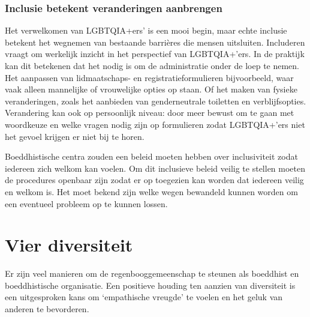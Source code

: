 \documentclass[12pt,openany]{book}
\begin{document}
\subsubsection*{Inclusie betekent veranderingen aanbrengen}

Het verwelkomen van LGBTQIA+ers' is een mooi begin, maar echte inclusie betekent het wegnemen van bestaande barrières die mensen uitsluiten. Includeren vraagt om werkelijk inzicht in het perspectief van LGBTQIA+'ers. In de praktijk kan dit betekenen dat het nodig is om de administratie onder de loep te nemen. Het aanpassen van lidmaatschaps- en registratieformulieren bijvoorbeeld, waar vaak alleen mannelijke of vrouwelijke opties op staan. Of het maken van fysieke veranderingen, zoals het aanbieden van genderneutrale toiletten en verblijfsopties.  Verandering kan ook op persoonlijk niveau: door meer bewust om te gaan met woordkeuze en welke vragen nodig zijn op formulieren zodat LGBTQIA+'ers niet het gevoel krijgen er niet bij te horen.

Boeddhistische centra zouden een beleid moeten hebben over inclusiviteit zodat iedereen zich welkom kan voelen. Om dit inclusieve beleid veilig te stellen moeten de procedures openbaar zijn zodat er op toegezien kan worden dat iedereen veilig en welkom is. Het moet bekend zijn welke wegen bewandeld kunnen worden om een eventueel probleem op te kunnen lossen.

\section*{Vier diversiteit} 

Er zijn veel manieren om de regenbooggemeenschap te steunen als boeddhist en boeddhistische organisatie. Een positieve houding ten aanzien van diversiteit is een uitgesproken kans om `empathische vreugde' te voelen en het geluk van anderen te bevorderen.
\end{document}
